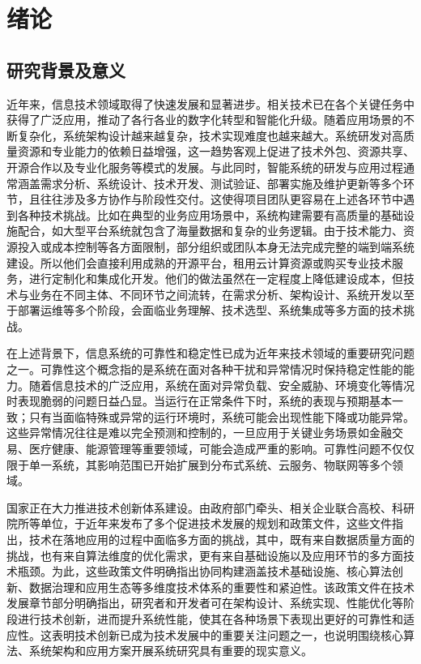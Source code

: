
\chapter{绪论}\label{ch:intro}

\newlength{\chonefigunit}
\newlength{\chonesidew}
\newlength{\chonemidw}
\newlength{\chonesidetxt}
\newlength{\chonegraytxt}

\section{研究背景及意义}\label{ux7814ux7a76ux80ccux666fux53caux610fux4e49}

近年来，信息技术领域取得了快速发展和显著进步。相关技术已在各个关键任务中获得了广泛应用，推动了各行各业的数字化转型和智能化升级。随着应用场景的不断复杂化，系统架构设计越来越复杂，技术实现难度也越来越大。系统研发对高质量资源和专业能力的依赖日益增强，这一趋势客观上促进了技术外包、资源共享、开源合作以及专业化服务等模式的发展。与此同时，智能系统的研发与应用过程通常涵盖需求分析、系统设计、技术开发、测试验证、部署实施及维护更新等多个环节，且往往涉及多方协作与阶段性交付。这使得项目团队更容易在上述各环节中遇到各种技术挑战。比如在典型的业务应用场景中，系统构建需要有高质量的基础设施配合，如大型平台系统就包含了海量数据和复杂的业务逻辑。由于技术能力、资源投入或成本控制等各方面限制，部分组织或团队本身无法完成完整的端到端系统建设。所以他们会直接利用成熟的开源平台，租用云计算资源或购买专业技术服务，进行定制化和集成化开发。他们的做法虽然在一定程度上降低建设成本，但技术与业务在不同主体、不同环节之间流转，在需求分析、架构设计、系统开发以至于部署运维等多个阶段，会面临业务理解、技术选型、系统集成等多方面的技术挑战。

在上述背景下，信息系统的可靠性和稳定性已成为近年来技术领域的重要研究问题之一。可靠性这个概念指的是系统在面对各种干扰和异常情况时保持稳定性能的能力。随着信息技术的广泛应用，系统在面对异常负载、安全威胁、环境变化等情况时表现脆弱的问题日益凸显。当运行在正常条件下时，系统的表现与预期基本一致；只有当面临特殊或异常的运行环境时，系统可能会出现性能下降或功能异常。这些异常情况往往是难以完全预测和控制的，一旦应用于关键业务场景如金融交易、医疗健康、能源管理等重要领域，可能会造成严重的影响。可靠性问题不仅仅限于单一系统，其影响范围已开始扩展到分布式系统、云服务、物联网等多个领域。

国家正在大力推进技术创新体系建设。由政府部门牵头、相关企业联合高校、科研院所等单位，于近年来发布了多个促进技术发展的规划和政策文件，这些文件指出，技术在落地应用的过程中面临多方面的挑战，其中，既有来自数据质量方面的挑战，也有来自算法维度的优化需求，更有来自基础设施以及应用环节的多方面技术瓶颈。为此，这些政策文件明确指出协同构建涵盖技术基础设施、核心算法创新、数据治理和应用生态等多维度技术体系的重要性和紧迫性。该政策文件在技术发展章节部分明确指出，研究者和开发者可在架构设计、系统实现、性能优化等阶段进行技术创新，进而提升系统性能，使其在各种场景下表现出更好的可靠性和适应性。这表明技术创新已成为技术发展中的重要关注问题之一，也说明围绕核心算法、系统架构和应用方案开展系统研究具有重要的现实意义。

